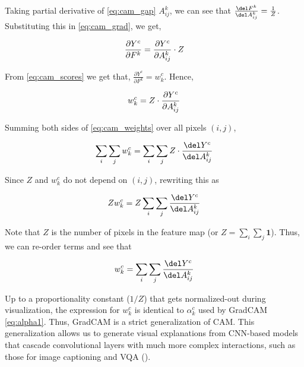 Taking partial derivative of  \eqref{eq:cam_gap} \wrt $A_{ij}^k$, we can see that $\frac{\del F^k}{\del A^k_{ij}} = \frac{1}{Z}$. Substituting this in \eqref{eq:cam_grad}, we get,
\begin{center}
\begin{equation}
    \frac{\partial Y^c}{\partial F^k} = \frac{\partial Y^c}{\partial A_{ij}^k} \cdot Z\\
\end{equation}
\end{center}

From \eqref{eq:cam_scores} we get that, $ \frac{\partial Y^c}{\partial F^k} = w_{k}^c$. Hence,

\begin{center}
\begin{equation}\label{eq:cam_weights}
    w_{k}^c = Z \cdot \frac{\partial Y^c}{\partial A_{ij}^k}\\
\end{equation}
\end{center}

Summing both sides of \eqref{eq:cam_weights} over all pixels $(i,j)$,

\begin{center}
\begin{equation}
    \sum_i \sum_j w^c_k  = \sum_i \sum_j Z \cdot \frac{\del Y^c}{\del A^k_{ij} }
\end{equation}
\end{center}

Since $Z$ and $w^c_k$ do not depend on $(i,j)$, rewriting this as

\begin{center}
\begin{equation}
    Z w^c_k  = Z \sum_i \sum_j \frac{\del Y^c}{\del A^k_{ij}}
\end{equation}
\end{center}

Note that $Z$ is the number of pixels in the feature map (or $Z = \sum_i \sum_j \mathbf{1} $).
Thus, we can re-order terms and see that

\begin{center}
\begin{equation}
    w^c_k  = \sum_i \sum_j \frac{\del Y^c}{\del A^k_{ij} }\\
\end{equation}
\end{center}

Up to a proportionality constant ($1/Z$) that gets normalized-out during
visualization, the expression for $w^c_k$ is identical to $\alpha^c_k$ used by GradCAM \eqref{eq:alpha1}.
Thus, GradCAM is a strict generalization of CAM.
This generalization allows us to generate visual explanations from CNN-based
models that cascade convolutional layers with much more complex interactions,
such as those for image captioning and VQA ().

